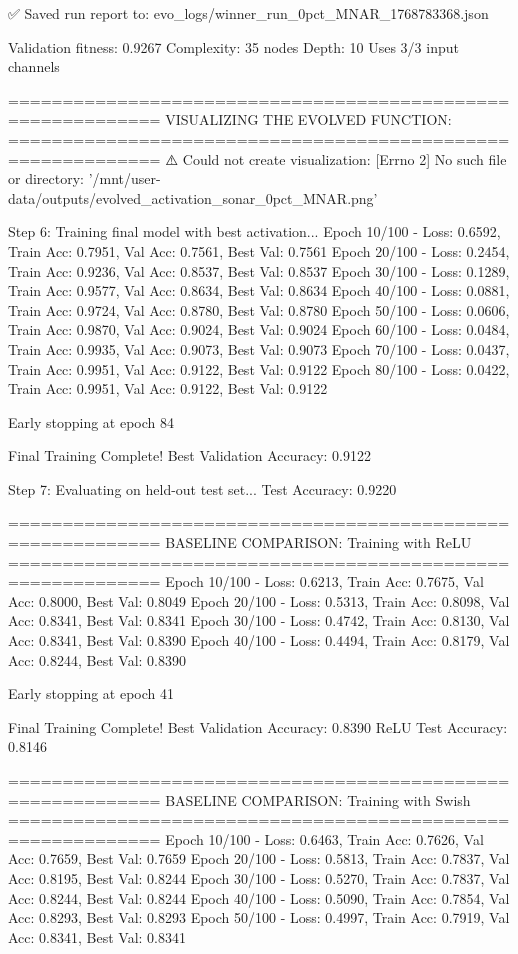 ✅ Saved run report to: evo_logs/winner_run_0pct_MNAR_1768783368.json

Validation fitness: 0.9267
Complexity: 35 nodes
Depth: 10
Uses 3/3 input channels

============================================================
VISUALIZING THE EVOLVED FUNCTION:
============================================================
⚠️ Could not create visualization: [Errno 2] No such file or directory: '/mnt/user-data/outputs/evolved_activation_sonar_0pct_MNAR.png'

Step 6: Training final model with best activation...
Epoch  10/100 - Loss: 0.6592, Train Acc: 0.7951, Val Acc: 0.7561, Best Val: 0.7561
Epoch  20/100 - Loss: 0.2454, Train Acc: 0.9236, Val Acc: 0.8537, Best Val: 0.8537
Epoch  30/100 - Loss: 0.1289, Train Acc: 0.9577, Val Acc: 0.8634, Best Val: 0.8634
Epoch  40/100 - Loss: 0.0881, Train Acc: 0.9724, Val Acc: 0.8780, Best Val: 0.8780
Epoch  50/100 - Loss: 0.0606, Train Acc: 0.9870, Val Acc: 0.9024, Best Val: 0.9024
Epoch  60/100 - Loss: 0.0484, Train Acc: 0.9935, Val Acc: 0.9073, Best Val: 0.9073
Epoch  70/100 - Loss: 0.0437, Train Acc: 0.9951, Val Acc: 0.9122, Best Val: 0.9122
Epoch  80/100 - Loss: 0.0422, Train Acc: 0.9951, Val Acc: 0.9122, Best Val: 0.9122

Early stopping at epoch 84

Final Training Complete!
Best Validation Accuracy: 0.9122

Step 7: Evaluating on held-out test set...
Test Accuracy: 0.9220

============================================================
BASELINE COMPARISON: Training with ReLU
============================================================
Epoch  10/100 - Loss: 0.6213, Train Acc: 0.7675, Val Acc: 0.8000, Best Val: 0.8049
Epoch  20/100 - Loss: 0.5313, Train Acc: 0.8098, Val Acc: 0.8341, Best Val: 0.8341
Epoch  30/100 - Loss: 0.4742, Train Acc: 0.8130, Val Acc: 0.8341, Best Val: 0.8390
Epoch  40/100 - Loss: 0.4494, Train Acc: 0.8179, Val Acc: 0.8244, Best Val: 0.8390

Early stopping at epoch 41

Final Training Complete!
Best Validation Accuracy: 0.8390
ReLU Test Accuracy: 0.8146

============================================================
BASELINE COMPARISON: Training with Swish
============================================================
Epoch  10/100 - Loss: 0.6463, Train Acc: 0.7626, Val Acc: 0.7659, Best Val: 0.7659
Epoch  20/100 - Loss: 0.5813, Train Acc: 0.7837, Val Acc: 0.8195, Best Val: 0.8244
Epoch  30/100 - Loss: 0.5270, Train Acc: 0.7837, Val Acc: 0.8244, Best Val: 0.8244
Epoch  40/100 - Loss: 0.5090, Train Acc: 0.7854, Val Acc: 0.8293, Best Val: 0.8293
Epoch  50/100 - Loss: 0.4997, Train Acc: 0.7919, Val Acc: 0.8341, Best Val: 0.8341

